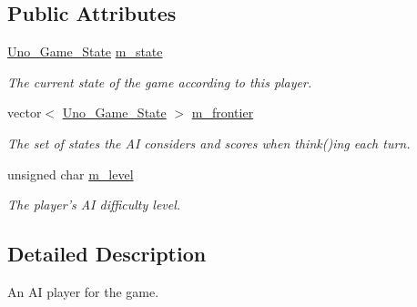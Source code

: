 \subsection*{\-Public \-Attributes}
\begin{DoxyCompactItemize}
\item 
\hypertarget{class_uno___a_i___player_acfca158f34aca68fab02191035463c1d}{
\hyperlink{class_uno___game___state}{\-Uno\-\_\-\-Game\-\_\-\-State} \hyperlink{class_uno___a_i___player_acfca158f34aca68fab02191035463c1d}{m\-\_\-state}}
\label{class_uno___a_i___player_acfca158f34aca68fab02191035463c1d}

\begin{DoxyCompactList}\small\item\em \-The current state of the game according to this player. \end{DoxyCompactList}\item 
\hypertarget{class_uno___a_i___player_a59968669473342ba3fe0aad108439719}{
vector$<$ \hyperlink{class_uno___game___state}{\-Uno\-\_\-\-Game\-\_\-\-State} $>$ \hyperlink{class_uno___a_i___player_a59968669473342ba3fe0aad108439719}{m\-\_\-frontier}}
\label{class_uno___a_i___player_a59968669473342ba3fe0aad108439719}

\begin{DoxyCompactList}\small\item\em \-The set of states the \-A\-I considers and scores when think()ing each turn. \end{DoxyCompactList}\item 
unsigned char \hyperlink{class_uno___a_i___player_a028b0df8cca96eb10fc87bebf0f48c25}{m\-\_\-level}
\begin{DoxyCompactList}\small\item\em \-The player's \-A\-I difficulty level. \end{DoxyCompactList}\end{DoxyCompactItemize}


\subsection{\-Detailed \-Description}
\-An \-A\-I player for the game. 

